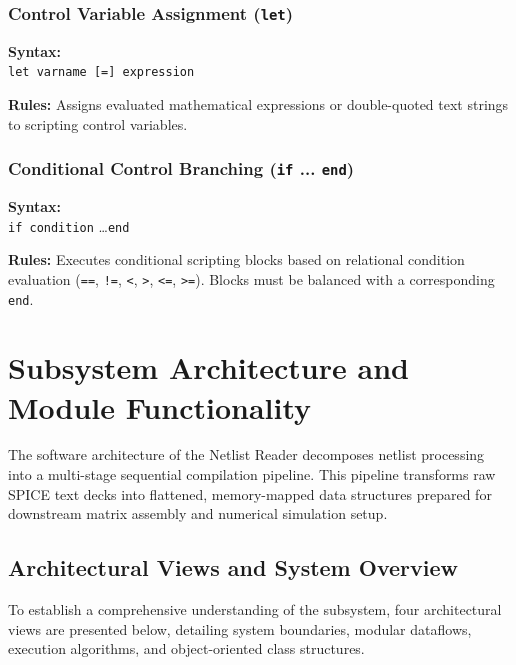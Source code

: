 \subsubsection{Control Variable Assignment (\texttt{let})}
\begin{compactitem}
    \item \textbf{Syntax:} \\
    \texttt{let varname [=] expression}
    \item \textbf{Rules:} Assigns evaluated mathematical expressions or double-quoted text strings to scripting control variables.
\end{compactitem}

\subsubsection{Conditional Control Branching (\texttt{if} ... \texttt{end})}
\begin{compactitem}
    \item \textbf{Syntax:} \\
    \texttt{if condition} \dots \texttt{end}
    \item \textbf{Rules:} Executes conditional scripting blocks based on relational condition evaluation (\texttt{==}, \texttt{!=}, \texttt{<}, \texttt{>}, \texttt{<=}, \texttt{>=}). Blocks must be balanced with a corresponding \texttt{end}.
\end{compactitem}


\section{Subsystem Architecture and Module Functionality}
\label{sec:subsystem_architecture}

The software architecture of the Netlist Reader decomposes netlist processing into a multi-stage sequential compilation pipeline. This pipeline transforms raw SPICE text decks into flattened, memory-mapped data structures prepared for downstream matrix assembly and numerical simulation setup.

\subsection{Architectural Views and System Overview}

To establish a comprehensive understanding of the subsystem, four architectural views are presented below, detailing system boundaries, modular dataflows, execution algorithms, and object-oriented class structures.

